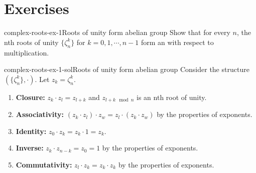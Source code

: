 \documentclass[preview]{standalone}
\begin{document}
\genpage

\section{Exercises}

\begin{snippetexercise}{complex-roots-ex-1}{Roots of unity form abelian group}
    Show that for every \(n\), the nth roots of unity \(\{\zeta_n^k\}\)
    for \(k = 0,1,\cdots, n-1\) form an \abeliangroup with respect to multiplication.
\end{snippetexercise}

\begin{snippetsolution}{complex-roots-ex-1-sol}{Roots of unity form abelian group}
    Consider the structure \((\{\zeta_n^k\}, \cdot)\).
    Let \(z_k = \zeta_n^k\).
    \begin{enumerate}
        \item \textbf{Closure:} \(z_k \cdot z_l = z_{l+k}\) and \(z_{l+k \mod n}\) is an nth root of unity.
        \item \textbf{Associativity:} \((z_k \cdot z_l) \cdot z_w = z_l \cdot (z_k \cdot z_w)\) by the properties of exponents.
        \item \textbf{Identity:} \(z_0 \cdot z_k = z_k \cdot 1 = z_k\).
        \item \textbf{Inverse:} \(z_k \cdot z_{n-k} = z_0 = 1\) by the properties of exponents.
        \item \textbf{Commutativity:} \(z_l \cdot z_k = z_k \cdot z_k\) by the properties of exponents.
    \end{enumerate}
\end{snippetsolution}
\end{document}
